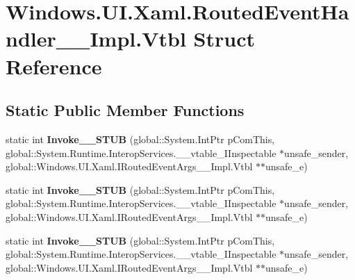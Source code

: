 \hypertarget{struct_windows_1_1_u_i_1_1_xaml_1_1_routed_event_handler_____impl_1_1_vtbl}{}\section{Windows.\+U\+I.\+Xaml.\+Routed\+Event\+Handler\+\_\+\+\_\+\+Impl.\+Vtbl Struct Reference}
\label{struct_windows_1_1_u_i_1_1_xaml_1_1_routed_event_handler_____impl_1_1_vtbl}
\subsection*{Static Public Member Functions}
\begin{DoxyCompactItemize}
\item 
\mbox{\label{struct_windows_1_1_u_i_1_1_xaml_1_1_routed_event_handler_____impl_1_1_vtbl_a5be57673455e191a5f61e1163012a6e7}} 
static int {\bfseries Invoke\+\_\+\+\_\+\+S\+T\+UB} (global\+::\+System.\+Int\+Ptr p\+Com\+This, global\+::\+System.\+Runtime.\+Interop\+Services.\+\_\+\+\_\+vtable\+\_\+\+I\+Inspectable $\ast$unsafe\+\_\+sender, global\+::\+Windows.\+U\+I.\+Xaml.\+I\+Routed\+Event\+Args\+\_\+\+\_\+\+Impl.\+Vtbl $\ast$$\ast$unsafe\+\_\+e)
\item 
\mbox{\label{struct_windows_1_1_u_i_1_1_xaml_1_1_routed_event_handler_____impl_1_1_vtbl_a5be57673455e191a5f61e1163012a6e7}} 
static int {\bfseries Invoke\+\_\+\+\_\+\+S\+T\+UB} (global\+::\+System.\+Int\+Ptr p\+Com\+This, global\+::\+System.\+Runtime.\+Interop\+Services.\+\_\+\+\_\+vtable\+\_\+\+I\+Inspectable $\ast$unsafe\+\_\+sender, global\+::\+Windows.\+U\+I.\+Xaml.\+I\+Routed\+Event\+Args\+\_\+\+\_\+\+Impl.\+Vtbl $\ast$$\ast$unsafe\+\_\+e)
\item 
\mbox{\label{struct_windows_1_1_u_i_1_1_xaml_1_1_routed_event_handler_____impl_1_1_vtbl_a5be57673455e191a5f61e1163012a6e7}} 
static int {\bfseries Invoke\+\_\+\+\_\+\+S\+T\+UB} (global\+::\+System.\+Int\+Ptr p\+Com\+This, global\+::\+System.\+Runtime.\+Interop\+Services.\+\_\+\+\_\+vtable\+\_\+\+I\+Inspectable $\ast$unsafe\+\_\+sender, global\+::\+Windows.\+U\+I.\+Xaml.\+I\+Routed\+Event\+Args\+\_\+\+\_\+\+Impl.\+Vtbl $\ast$$\ast$unsafe\+\_\+e)
$$
\end{DoxyCompactItemize}
